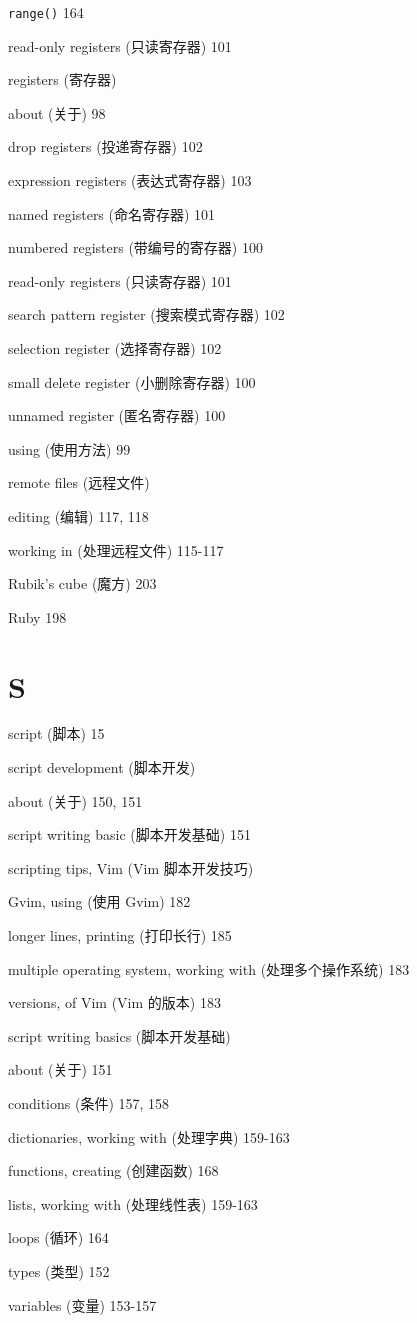 \begin{multicols}{2}
\texttt{range()} 164

read-only registers (只读寄存器) 101

registers (寄存器) \par
  about (关于) 98 \par
  drop registers (投递寄存器) 102 \par
  expression registers (表达式寄存器) 103 \par
  named registers (命名寄存器) 101 \par
  numbered registers (带编号的寄存器) 100 \par
  read-only registers (只读寄存器) 101 \par
  search pattern register (搜索模式寄存器) 102 \par
  selection register (选择寄存器) 102 \par
  small delete register (小删除寄存器) 100 \par
  unnamed register (匿名寄存器) 100 \par
  using (使用方法) 99 \par

remote files (远程文件) \par
  editing (编辑) 117, 118 \par
  working in (处理远程文件) 115-117 \par

Rubik's cube (魔方) 203

Ruby 198

\section*{S}

script (脚本) 15

script development (脚本开发) \par
  about (关于) 150, 151 \par
  script writing basic (脚本开发基础) 151 \par

scripting tips, Vim (Vim 脚本开发技巧) \par
  Gvim, using (使用 Gvim) 182 \par
  longer lines, printing (打印长行) 185 \par
  multiple operating system, working with (处理多个操作系统) 183 \par
  versions, of Vim (Vim 的版本) 183 \par

script writing basics (脚本开发基础) \par
  about (关于) 151 \par
  conditions (条件) 157, 158 \par
  dictionaries, working with (处理字典) 159-163 \par
  functions, creating (创建函数) 168 \par
  lists, working with (处理线性表) 159-163 \par
  loops (循环) 164 \par
  types (类型) 152 \par
  variables (变量) 153-157 \par


\end{multicols}
